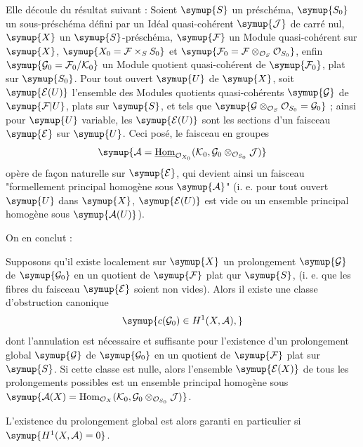 Elle découle du résultat suivant :
 Soient $\symup{S}$ un préschéma, $\symup{S_0}$ un sous-préschéma
défini par un Idéal quasi-cohérent $\symup{\mathcal J}$ de carré nul, $\symup{X}$ un
$\symup{S}$-préschéma, $\symup{\mathcal F}$ un Module quasi-cohérent sur $\symup{X}$,
$\symup{X_0=\mathcal F\times_SS_0}$ et
$\symup{\mathcal F_0=\mathcal F\otimes_{\mathcal O_S}\mathcal O_{S_0}}$, enfin
$\symup{\mathcal G_0=\mathcal F_0/\mathcal K_0}$ un Module quotient quasi-cohérent de
$\symup{\mathcal F_0}$, plat sur $\symup{S_0}$. Pour tout ouvert $\symup{U}$ de $\symup{X}$, soit
$\symup{\mathcal E(U)}$ l'ensemble des Modules quotients quasi-cohérents $\symup{\mathcal G}$ de
$\symup{\mathcal F|U}$, plats sur $\symup{S}$, et tels que
$\symup{\mathcal G\otimes_{\mathcal O_S}\mathcal O_{S_0}=\mathcal G_0}$ ; ainsi pour
$\symup{U}$ variable, les $\symup{\mathcal E(U)}$ sont les sections d'un faisceau $\symup{\mathcal E}$
sur $\symup{U}$. Ceci posé, le faisceau en groupes
\[
\symup{\mathcal A=\underline{\operatorname{Hom}}_{\mathcal O_{X_0}}
(\mathcal K_0,\mathcal G_0\otimes_{\mathcal O_{S_0}}\mathcal J)}
\]
opère de façon naturelle sur $\symup{\mathcal E}$, qui devient ainsi un faisceau
"formellement principal homogène sous $\symup{\mathcal A}$" (i. e. pour tout ouvert
$\symup{U}$ dans $\symup{X}$, $\symup{\mathcal E(U)}$ est vide ou un ensemble principal homogène sous
$\symup{\mathcal A(U)}$).

On en conclut :

 Supposons qu'il existe localement sur $\symup{X}$ un
prolongement $\symup{\mathcal G}$ de $\symup{\mathcal G_0}$ en un quotient de $\symup{\mathcal F}$ plat
qur $\symup{S}$, (i. e. que les fibres du faisceau $\symup{\mathcal E}$ soient non vides). Alors
il existe une classe d'obstruction canonique
\[
\symup{c(\mathcal G_0)\in H^1(X,\mathcal A),}
\]
dont l'annulation est nécessaire et suffisante pour l'existence d'un
prolongement global $\symup{\mathcal G}$ de $\symup{\mathcal G_0}$ en un quotient de
$\symup{\mathcal F}$ plat sur $\symup{S}$. Si cette classe est nulle, alors l'ensemble
$\symup{\mathcal E(X)}$ de tous les prolongements possibles est un ensemble principal
homogène sous $\symup{\mathcal A(X)=\operatorname{Hom}_{\mathcal O_X}(\mathcal K_0,\mathcal G_0\otimes_{\mathcal O_{S_0}}\mathcal J)}$.

L'existence du prolongement global est alors garanti en particulier si
$\symup{H^1(X,\mathcal A)=0}$.

